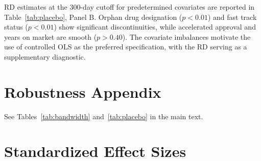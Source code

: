 \documentclass[12pt]{article}
\begin{document}
RD estimates at the 300-day cutoff for predetermined covariates are reported in Table~\ref{tab:placebo}, Panel B. Orphan drug designation ($p < 0.01$) and fast track status ($p < 0.01$) show significant discontinuities, while accelerated approval and years on market are smooth ($p > 0.40$). The covariate imbalances motivate the use of controlled OLS as the preferred specification, with the RD serving as a supplementary diagnostic.

\section{Robustness Appendix}

See Tables~\ref{tab:bandwidth} and~\ref{tab:placebo} in the main text.

\section{Standardized Effect Sizes}
\label{sec:sde}


\end{document}
